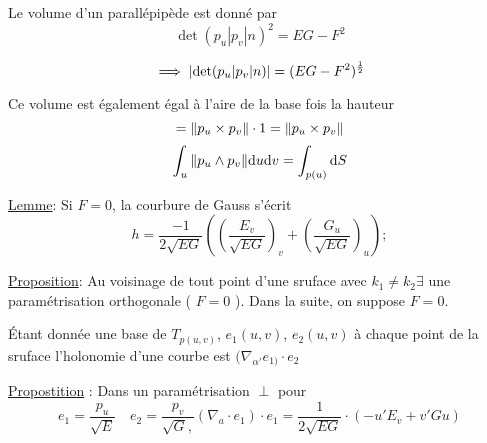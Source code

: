 Le volume d'un parallépipède est donné par $$\det(p_u | p_v |n)^2 = EG-F^2$$ 

$$\implies \abs{\det(p_{u} | p_v | n)} = (EG -F^2)^{\frac{1}{2} }$$ 

Ce volume est également égal à l'aire de la base fois la hauteur $$= \norm{p_u \times  p_v } \cdot 1 = \norm{p_u \times p_v}  $$ 
$$\int_u \norm{p_u \wedge p_v}\dd u \dd v = \int_{p(u)} \dd S $$ 

\underline{Lemme}: Si $F= 0$, la courbure de Gauss s'écrit $$h = \frac{-1}{2\sqrt{EG}} \left( \left( \frac{E_v}{\sqrt{EG}}  \right)_v + \left( \frac{G_u}{\sqrt{EG}}  \right)_u  \right) ;  $$  

\underline{Proposition}: Au voisinage de tout point d'une sruface avec $k_1 \neq k_2 \exists$ une paramétrisation orthogonale ( $F=0$ ). Dans la suite, on suppose $F=0$.

Étant donnée une base de $T_{p(u,v)}$, $e_1 (u,v)$, $e_2 (u,v)$ à chaque point de la sruface l'holonomie d'une courbe est $(\nabla_{\alpha'} e_{1)} \cdot  e_2$  

\underline{Propostition} : Dans un paramétrisation $\perp$ pour $$e_1 = \frac{p_u}{\sqrt{E}} \quad e_2 = \frac{p_v}{\sqrt{G},} (\nabla_a \cdot e_1 ) \cdot e_1 =\frac{1}{2\sqrt{EG}} \cdot (-u'E_v + v' Gu) $$    



